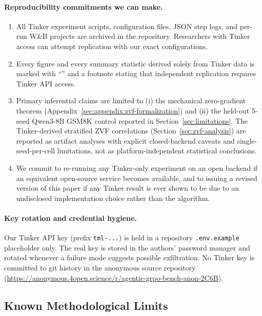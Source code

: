 \documentclass{article}
\begin{document}
\paragraph{Reproducibility commitments we can make.}
\begin{enumerate}
  \item All Tinker experiment scripts, configuration files, JSON step
        logs, and per-run W\&B projects are archived in the repository.
        Researchers with Tinker access can attempt replication with our
        exact configurations.
  \item Every figure and every summary statistic derived solely from
        Tinker data is marked with ``\dag'' and a footnote stating that
        independent replication requires Tinker API access.
  \item Primary inferential claims are limited to (i) the mechanical
        zero-gradient theorem (Appendix~\ref{sec:appendix:zvf-formalization})
        and (ii) the held-out 5-seed Qwen3-8B GSM8K control reported in
        Section~\ref{sec:limitations}. The Tinker-derived stratified ZVF
        correlations (Section~\ref{sec:zvf-analysis}) are reported as
        artifact analyses with explicit closed-backend caveats and
        single-seed-per-cell limitations, not as platform-independent
        statistical conclusions.
  \item We commit to re-running any Tinker-only experiment on an open
        backend if an equivalent open-source service becomes available,
        and to issuing a revised version of this paper if any Tinker
        result is ever shown to be due to an undisclosed
        implementation choice rather than the algorithm.
\end{enumerate}

\paragraph{Key rotation and credential hygiene.}
Our Tinker API key (prefix \texttt{tml-...}) is held in a repository
\texttt{.env.example} placeholder only. The real key is stored in the
authors' password manager and rotated whenever a failure mode suggests
possible exfiltration. No Tinker key is committed to git history in the
anonymous source repository
(\url{https://anonymous.4open.science/r/agentic-grpo-bench-anon-2C6B}).

\subsection{Known Methodological Limits}
\label{sec:methodlimits}
\end{document}

